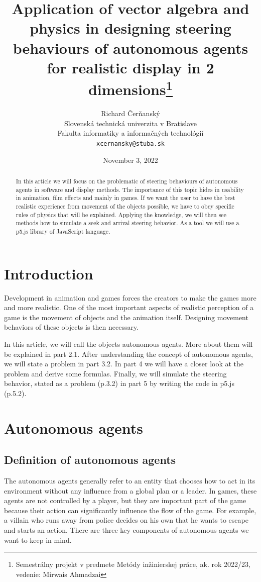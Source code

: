 \documentclass[10pt,twoside,slovak,a4paper]{article}
\title{Application of vector algebra and physics in designing steering behaviours of autonomous agents for realistic display in 2 dimensions\thanks{Semestrálny projekt v predmete Metódy inžinierskej práce, ak. rok 2022/23, vedenie: Mirwais Ahmadzai}}
\author{Richard Čerňanský\\[2pt]
	{\small Slovenská technická univerzita v Bratislave}\\
	{\small Fakulta informatiky a informačných technológií}\\
	{\small \texttt{xcernansky@stuba.sk}}
	}
\date{\small November 3, 2022 }
\begin{document}
\maketitle

\begin{abstract}

In this article we will focus on the problematic of steering behaviours of autonomous agents in software and display methods. The importance of this topic hides in usability in animation, film effects and mainly in games. If we want the user to have the best realistic experience from movement of the objects possible, we have to obey specific rules of physics that will be explained. Applying the knowledge, we will then see methods how to simulate a seek and arrival steering behavior. As a tool we will use a p5.js library of JavaScript language.

\end{abstract}


\section{Introduction}

Development in animation and games forces the creators to make the games more and more realistic. One of the most important aspects of realistic perception of a game is the movement of objects and the animation itself. Designing movement behaviors of these objects is then necessary. 

In this article, we will call the objects autonomous agents. More about them will be explained in part 2.1. After understanding the concept of autonomous agents, we will state a problem in part 3.2. In part 4 we will have a closer look at the problem and derive some formulas. Finally, we will simulate the steering behavior, stated as a problem (p.3.2) in part 5 by writing the code in p5.js (p.5.2).

\section{Autonomous agents} \label{autonomous agents}

\subsection{Definition of autonomous agents} \label{definition of a.a.}

The autonomous agents generally refer to an entity that chooses how to act in its environment without any influence from a global plan or a leader. In games, these agents are not controlled by a player, but they are important part of the game because their action can significantly influence the flow of the game. For example, a villain who runs away from police decides on his own that he wants to escape and starts an action. There are three key components of autonomous agents we want to keep in mind. 
\end{document}
